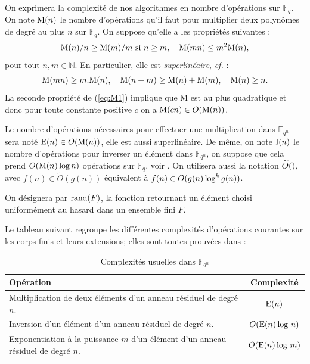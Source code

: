 \documentclass[a4paper]{article} %
\numberwithin{section}{part}
\numberwithin{equation}{section}
\newcommand\GF[1]{\mathbb{F}_{#1}}
\newcommand\NN{\mathbb{N}}
\newcommand\M[1]{\textup{M}(#1)}
\newcommand\E[1]{\textup{E}(#1)}
\newcommand\I[1]{\textup{I}(#1)}
\newcommand\tO[1]{\widetilde{O}(#1)}
\begin{document}
On exprimera la complexité de nos algorithmes en nombre d'opérations sur 
$\GF{q}$. On note $\M{n}$ le nombre d'opérations qu'il faut pour multiplier deux
polynômes de degré au plus $n$ sur $\GF{q}$. On suppose qu'elle a les propriétés
suivantes :
\begin{equation}
\label{eq:M1}
\M{n}/n\geq\M{m}/m\textup{ si }n\geq m,\quad \M{mn} \leq m^2\M{n},
\end{equation}
pour tout $n, m\in\NN$. En particulier, elle est \emph{superlinéaire}, 
\emph{cf.} \cite{GaGe} :
\begin{equation}
\M{mn}\geq m.\M{n},\quad \M{n + m}\geq\M{n} + \M{m}, \quad \M{n}\geq n.
\end{equation}
La seconde propriété de (\ref{eq:M1}) implique que M est au plus quadratique et 
donc pour toute constante positive $c$ on a $\M{cn}\in O(\M{n})$.\par
Le nombre d'opérations nécessaires pour effectuer une multiplication dans
$\GF{q^n}$ sera noté $\E{n}\in O(\M{n})$, elle est aussi superlinéaire. De même,
on note $\I{n}$ le nombre d'opérations pour inverser un élément dans $\GF{q^n}$,
on suppose que cela prend $O(\M{n}\,\textup{log\,}n)$ opérations sur $\GF{q}$,
voir \cite{GaGe}.
On utilisera aussi la notation $\tO$, avec $f(n)\in\tO{g(n)}$
équivalent à $f(n)\in O(g(n)\,\textup{log}^k\,g(n))$.
\begin{defn}
On désignera par $\textup{rand}(F)$, la fonction retournant un élément choisi
uniformément au hasard dans un ensemble fini $F$.
\end{defn}
Le tableau suivant regroupe les différentes complexités d'opérations courantes 
sur les corps finis et leurs extensions; elles sont toutes prouvées dans 
\cite{GaGe} :
\begin{table}[H]
\centering
\begin{tabular}{|p{7cm}|c|}
    \hline
    Opération & Complexité\\
    \hline\hline
    Multiplication de deux éléments d'un anneau résiduel de degré $n$. & 
    $\E{n}$\\
    \hline
    Inversion d'un élément d'un anneau résiduel de degré $n$. &
    $O(\E{n}\,\textup{log }n)$\\
    \hline
    Exponentiation à la puissance $m$ d'un élément d'un anneau résiduel de degré
    $n$. & $O(\E{n}\,\textup{log }m)$\\
    \hline
\end{tabular}
\caption{Complexités usuelles dans $\GF{q^n}$}
\label{tab:compl}
\end{table}
\newpage
\end{document}
